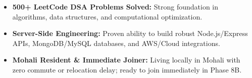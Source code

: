 \documentclass[a4paper,10pt]{article}
\begin{document}
\begin{itemize}

    \item \textbf{500+ LeetCode DSA Problems Solved:} Strong foundation in algorithms, data structures, and computational optimization.

    \item \textbf{Server-Side Engineering:} Proven ability to build robust Node.js/Express APIs, MongoDB/MySQL databases, and AWS/Cloud integrations.

    \item \textbf{Mohali Resident \& Immediate Joiner:} Living locally in Mohali with zero commute or relocation delay; ready to join immediately in Phase 8B.

\end{itemize}

\end{document}
